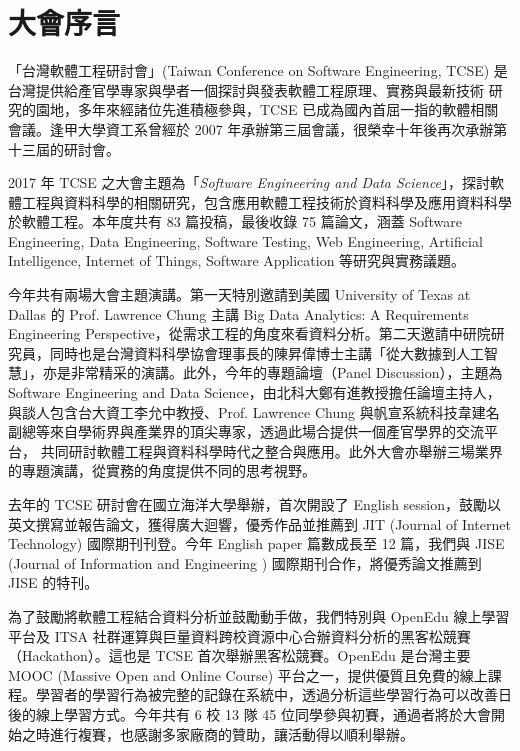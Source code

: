 \documentclass[12pt,oneside,a4paper]{book}
\newcommand{\mIndent}{\hspace{.5cm}}
\begin{document}
  


\chapter*{大會序言}

「台灣軟體工程研討會」(Taiwan Conference on Software Engineering, TCSE) 是台灣提供給產官學專家與學者一個探討與發表軟體工程原理、實務與最新技術 研究的園地，多年來經諸位先進積極參與，TCSE 已成為國內首屈一指的軟體相關會議。逢甲大學資工系曾經於 2007 年承辦第三屆會議，很榮幸十年後再次承辦第十三屆的研討會。

\mIndent 2017 年 TCSE 之大會主題為「\textit{Software Engineering and Data Science}」，探討軟體工程與資料科學的相關研究，包含應用軟體工程技術於資料科學及應用資料科學於軟體工程。本年度共有 83 篇投稿，最後收錄 75 篇論文，涵蓋 Software Engineering, Data Engineering, Software Testing, Web Engineering, Artificial Intelligence, Internet of Things, Software Application 等研究與實務議題。

\mIndent 今年共有兩場大會主題演講。第一天特別邀請到美國 University of Texas at Dallas 的 Prof. Lawrence Chung 主講 Big Data Analytics: A Requirements Engineering Perspective，從需求工程的角度來看資料分析。第二天邀請中研院研究員，同時也是台灣資料科學協會理事長的陳昇偉博士主講「從大數據到人工智慧」，亦是非常精采的演講。此外，今年的專題論壇（Panel Discussion），主題為 Software Engineering and Data Science，由北科大鄭有進教授擔任論壇主持人， 與談人包含台大資工李允中教授、Prof. Lawrence Chung 與帆宣系統科技韋建名副總等來自學術界與產業界的頂尖專家，透過此場合提供一個產官學界的交流平台， 共同研討軟體工程與資料科學時代之整合與應用。此外大會亦舉辦三場業界的專題演講，從實務的角度提供不同的思考視野。


\mIndent 去年的 TCSE 研討會在國立海洋大學舉辦，首次開設了 English session，鼓勵以英文撰寫並報告論文，獲得廣大迴響，優秀作品並推薦到 JIT (Journal of Internet Technology) 國際期刊刊登。今年 English paper 篇數成長至 12 篇，我們與 JISE (Journal of Information and Engineering ) 國際期刊合作，將優秀論文推薦到 JISE 的特刊。

\mIndent 為了鼓勵將軟體工程結合資料分析並鼓勵動手做，我們特別與 OpenEdu 線上學習平台及 ITSA 社群運算與巨量資料跨校資源中心合辦資料分析的黑客松競賽（Hackathon）。這也是 TCSE 首次舉辦黑客松競賽。OpenEdu 是台灣主要 MOOC (Massive Open and Online Course) 平台之一，提供優質且免費的線上課程。學習者的學習行為被完整的記錄在系統中，透過分析這些學習行為可以改善日後的線上學習方式。今年共有 6 校 13 隊 45 位同學參與初賽，通過者將於大會開始之時進行複賽，也感謝多家廠商的贊助，讓活動得以順利舉辦。
\end{document}
